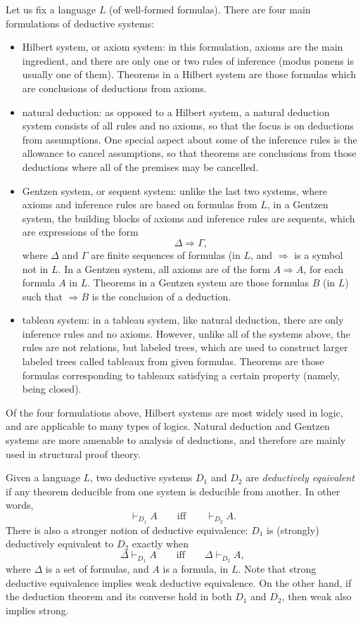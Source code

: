 \documentclass[12pt]{article}
\begin{document}
Let us fix a language $L$ (of well-formed formulas).  There are four main formulations of deductive systems:
\begin{itemize}
\item Hilbert system, or axiom system:  in this formulation, axioms are the main ingredient, and there are only one or two rules of inference (modus ponens is usually one of them).  Theorems in a Hilbert system are those formulas which are conclusions of deductions from axioms.
\item natural deduction:  as opposed to a Hilbert system, a natural deduction system consists of all rules and no axioms, so that the focus is on deductions from assumptions.  One special aspect about some of the inference rules is the allowance to cancel assumptions, so that theorems are conclusions from those deductions where all of the premises may be cancelled.
\item Gentzen system, or sequent system: unlike the last two systems, where axioms and inference rules are based on formulas from $L$, in a Gentzen system, the building blocks of axioms and inference rules are sequents, which are expressions of the form $$\Delta \Rightarrow \Gamma,$$ where $\Delta$ and $\Gamma$ are finite sequences of formulas (in $L$, and $\Rightarrow$ is a symbol not in $L$.  In a Gentzen system, all axioms are of the form $A\Rightarrow A$, for each formula $A$ in $L$.  Theorems in a Gentzen system are those formulas $B$ (in $L$) such that $\Rightarrow B$ is the conclusion of a deduction.
\item tableau system: in a tableau system, like natural deduction, there are only inference rules and no axioms.  However, unlike all of the systems above, the rules are not relations, but labeled trees, which are used to construct larger labeled trees called tableaux from given formulas.  Theorems are those formulas corresponding to tableaux satisfying a certain property (namely, being closed).
\end{itemize}

Of the four formulations above, Hilbert systems are most widely used in logic, and are applicable to many types of logics.  Natural deduction and Gentzen systems are more amenable to analysis of deductions, and therefore are mainly used in structural proof theory.

Given a language $L$, two deductive systems $D_1$ and $D_2$ are \emph{deductively equivalent} if any theorem deducible from one system is deducible from another.  In other words, $$ \vdash_{D_1} A \qquad \mbox{iff} \qquad \vdash_{D_2} A.$$
There is also a stronger notion of deductive equivalence: $D_1$ is (strongly) deductively equivalent to $D_2$ exactly when $$\Delta \vdash_{D_1} A \qquad \mbox{iff} \qquad \Delta \vdash_{D_2} A,$$
where $\Delta$ is a set of formulas, and $A$ is a formula, in $L$.  Note that strong deductive equivalence implies weak deductive equivalence.  On the other hand, if the deduction theorem and its converse hold in both $D_1$ and $D_2$, then weak also implies strong.
\end{document}
